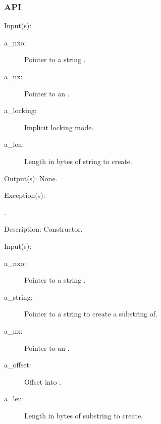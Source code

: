 \subsubsection{API}
\begin{capi}
\label{nxo_string_new}
	\begin{capilist}
	\item[Input(s): ]
		\begin{description}\item[]
		\item[a\_nxo: ]
			Pointer to a string .
		\item[a\_nx: ]
			Pointer to an .
		\item[a\_locking: ]
			Implicit locking mode.
		\item[a\_len: ]
			Length in bytes of string to create.
		\end{description}
	\item[Output(s): ] None.
	\item[Exception(s): ]
		\begin{description}\item[]
		\item[.]
		\end{description}
	\item[Description: ]
		Constructor.
	\end{capilist}
\label{nxo_string_substring_new}
	\begin{capilist}
	\item[Input(s): ]
		\begin{description}\item[]
		\item[a\_nxo: ]
			Pointer to a string \classname{nxo}.
		\item[a\_string: ]
			Pointer to a string  to create a
			substring of.
		\item[a\_nx: ]
			Pointer to an \classname{nx}.
		\item[a\_offset: ]
			Offset into \cvar{a\_string}.
		\item[a\_len: ]
			Length in bytes of substring to create.

\end{description}
\end{capilist}
\end{capi}
